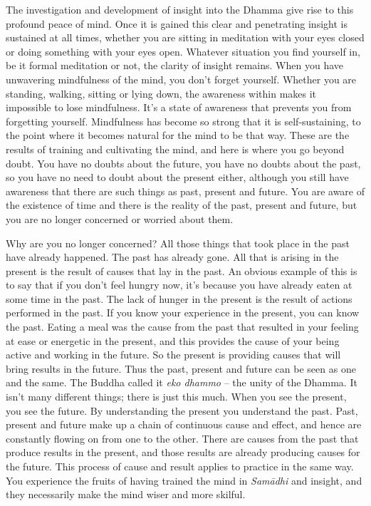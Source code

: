 The investigation and development of insight into the Dhamma give rise to this profound peace of mind. Once it is gained this clear and penetrating insight is sustained at all times, whether you are sitting in meditation with your eyes closed or doing something with your eyes open. Whatever situation you find yourself in, be it formal meditation or not, the clarity of insight remains. When you have unwavering mindfulness of the mind, you don't forget yourself. Whether you are standing, walking, sitting or lying down, the awareness within makes it impossible to lose mindfulness. It's a state of awareness that prevents you from forgetting yourself. Mindfulness has become so strong that it is self-sustaining, to the point where it becomes natural for the mind to be that way. These are the results of training and cultivating the mind, and here is where you go beyond doubt. You have no doubts about the future, you have no doubts about the past, so you have no need to doubt about the present either, although you still have awareness that there are such things as past, present and future. You are aware of the existence of time and there is the reality of the past, present and future, but you are no longer concerned or worried about them.

Why are you no longer concerned? All those things that took place in the past have already happened. The past has already gone. All that is arising in the present is the result of causes that lay in the past. An obvious example of this is to say that if you don't feel hungry now, it's because you have already eaten at some time in the past. The lack of hunger in the present is the result of actions performed in the past. If you know your experience in the present, you can know the past. Eating a meal was the cause from the past that resulted in your feeling at ease or energetic in the present, and this provides the cause of your being active and working in the future. So the present is providing causes that will bring results in the future. Thus the past, present and future can be seen as one and the same. The Buddha called it \textit{eko dhammo} --  the unity of the Dhamma. It isn't many different things; there is just this much. When you see the present, you see the future. By understanding the present you understand the past. Past, present and future make up a chain of continuous cause and effect, and hence are constantly flowing on from one to the other. There are causes from the past that produce results in the present, and those results are already producing causes for the future. This process of cause and result applies to practice in the same way. You experience the fruits of having trained the mind in \textit{Sam\=adhi} and insight, and they necessarily make the mind wiser and more skilful.

